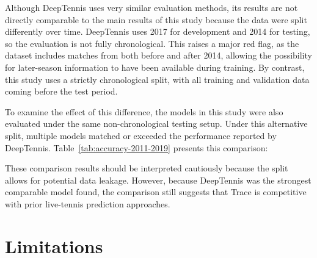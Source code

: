 \documentclass[10pt,twocolumn]{article}
\begin{document}
Although DeepTennis uses very similar evaluation methods, its results are not directly comparable to the main results of this study because the data were split differently over time. DeepTennis uses 2017 for development and 2014 for testing, so the evaluation is not fully chronological. This raises a major red flag, as the dataset includes matches from both before and after 2014, allowing the possibility for later-season information to have been available during training. By contrast, this study uses a strictly chronological split, with all training and validation data coming before the test period.

To examine the effect of this difference, the models in this study were also evaluated under the same non-chronological testing setup. Under this alternative split, multiple models matched or exceeded the performance reported by DeepTennis. Table~\ref{tab:accuracy-2011-2019} presents this comparison:

\begin{table}[H]
\centering
\caption{Accuracy under the 2011--2019 non-chronological split; HGBM denotes the histogram gradient-boosting model, and Trace reaches 81.30\% across all points on this comparison split. Source: authors' model evaluation.\cite{xie2026}}
\label{tab:accuracy-2011-2019}
\end{table}

These comparison results should be interpreted cautiously because the split allows for potential data leakage. However, because DeepTennis was the strongest comparable model found, the comparison still suggests that Trace is competitive with prior live-tennis prediction approaches.

\section{Limitations}
\end{document}
